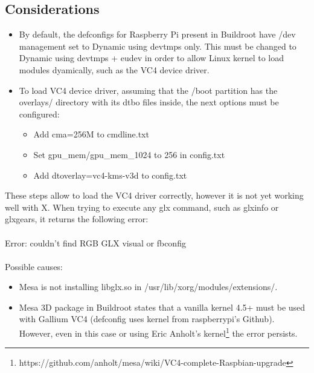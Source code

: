 \documentclass[12pt,a4paper,oneside]{article}
\begin{document}
\subsection*{Considerations}
\begin{itemize}
    \item By default, the defconfigs for Raspberry Pi present in Buildroot have
    /dev management set to {\selectfont Dynamic using devtmps only}.
    This must be changed to {\selectfont Dynamic using devtmps +
    eudev} in order to allow Linux kernel to load modules dyamically, such as the
    VC4 device driver.

    \item To load VC4 device driver, assuming that the {\selectfont
    /boot} partition has the {\selectfont overlays/} directory with
    its dtbo files inside, the next options must be configured:
    \begin{itemize}
      \item Add cma=256M to cmdline.txt
      \item Set gpu\_mem/gpu\_mem\_1024 to 256 in config.txt
      \item Add dtoverlay=vc4-kms-v3d to config.txt
    \end{itemize}
  \end{itemize}
These steps allow to load the VC4 driver correctly, however it is not yet
working well with X. When trying to execute any {\selectfont
glx} command, such as {\selectfont glxinfo} or
{\selectfont glxgears}, it returns the following error:\\\\
{\selectfont Error: couldn't find RGB GLX visual or fbconfig}\\\\
Possible causes:
\begin{itemize}
  \item Mesa is not installing libglx.so in {\selectfont
  /usr/lib/xorg/modules/extensions/}.
  \item Mesa 3D package in Buildroot states that a vanilla kernel 4.5+ must
  be used with Gallium VC4 (defconfig uses kernel from raspberrypi's Github).
  However, even in this case or using Eric Anholt's kernel\footnote{https://github.com/anholt/mesa/wiki/VC4-complete-Raspbian-upgrade}
  the error persists.
\end{itemize}
\end{document}
